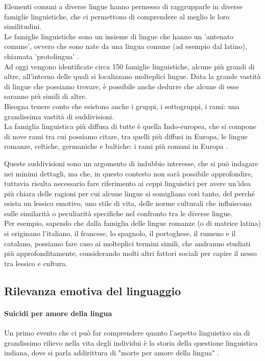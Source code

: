 Elementi comuni a diverse lingue hanno permesso di raggrupparle in diverse famiglie linguistiche, che ci permettono di comprendere al meglio le loro similitudini.\\
Le famiglie linguistiche sono un insieme di lingue che hanno un 'antenato comune', ovvero che sono nate da una lingua comune (ad esempio dal latino), chiamata 'protolingua' \parencite{Family_of_language}.\\
Ad oggi vengono identificate circa 150 famiglie linguistiche, alcune più grandi di altre, all'interno delle quali si localizzano molteplici lingue. Data la grande vastità di lingue che possiamo trovare, è possibile anche dedurre che alcune di esse saranno più simili di altre.\\
Bisogna tenere conto che esistono anche i gruppi, i sottogruppi, i rami: una grandissima vastità di suddivisioni. \\
La famiglia linguistica più diffusa di tutte è quella Indo-europea, che si compone di nove rami tra cui possiamo citare, tra quelli più diffusi in Europa, le lingue romanze, celtiche, germaniche e baltiche: i rami più comuni in Europa \parencite{fam_linguistiche}. 

Queste suddivisioni sono un argomento di indubbio interesse, che si può indagare nei minimi dettagli, ma  che, in questo contesto non sarà possibile approfondire, tuttavia risulta necessario fare riferimento ai ceppi linguistici per avere un’idea più chiara delle ragioni per cui alcune lingue si somigliano così tanto, del perché esista un lessico emotivo, uno stile di  vita, delle norme culturali che influiscono sulle similarità o peculiarità specifiche nel confronto tra le diverse lingue.\\
Per esempio, sapendo che dalla famiglia delle lingue romanze (o di matrice latina) si originano l’italiano, il francese, lo spagnolo, il portoghese, il rumeno e il catalano, possiamo fare caso ai molteplici termini simili, che andranno studiati più approfonditamente, considerando molti altri fattori sociali per capire il nesso tra lessico e cultura. 

\subsection{Rilevanza emotiva del linguaggio}
\paragraph{Suicidi per amore della lingua}
Un primo evento che ci può far comprendere quanto l'aspetto linguistico sia di grandissimo rilievo nella vita degli individui è la storia della questione linguistica indiana, dove si parla addirittura di "morte per amore della lingua" \parencite{language_emotion_politics}. 

